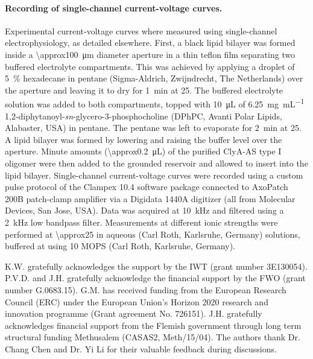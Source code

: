 \documentclass[journal=ancac3,manuscript=article,etalmode=truncate,maxauthors=0,layout=onecolumn]{achemso}
\begin{document}
\paragraph{Recording of single-channel current-voltage curves.}
%
Experimental current-voltage curves where measured using single-channel electrophysiology, as detailed
elsewhere.\cite{Maglia-2010,Soskine-2012,Soskine-2013} First, a black lipid bilayer was formed inside a
\SI{\approx100}{\um} diameter aperture in a thin teflon film separating two buffered electrolyte compartments.
This was achieved by applying a droplet of \SI{5}{\percent} hexadecane in pentane (Sigma-Aldrich, Zwijndrecht,
The Netherlands) over the aperture and leaving it to dry for \SI{1}{\minute} at \SI{25}{\dC}. The buffered
electrolyte solution was added to both compartments, topped with \SI{10}{\uL} of
\SI{6.25}{\milli\gram\per\milli\liter} 1,2-diphytanoyl-\textit{sn}-glycero-3-phosphocholine (DPhPC, Avanti
Polar Lipids, Alabaster, USA) in pentane. The pentane was left to evaporate for \SI{2}{\minute} at
\SI{25}{\dC}. A lipid bilayer was formed by lowering and raising the buffer level over the aperture. Minute
amounts (\SI{\approx0.2}{\uL}) of the purified ClyA-AS type I oligomer were then added to the grounded \cisi{}
reservoir and allowed to insert into the lipid bilayer. Single-channel current-voltage curves were recorded
using a custom pulse protocol of the Clampex 10.4 software package connected to AxoPatch 200B patch-clamp
amplifier via a Digidata 1440A digitizer (all from Molecular Devices, San Jose, USA). Data was acquired at
\SI{10}{\kHz} and filtered using a \SI{2}{\kHz} low bandpass filter. Measurements at different ionic strengths
were performed at \SI{\approx25}{\dC} in aqueous  (Carl Roth, Karlsruhe, Germany) solutions, buffered
at  using \SI{10}{\mM} MOPS (Carl Roth, Karlsruhe, Germany).

\begin{acknowledgement}
  K.W. gratefully acknowledges the support by the IWT (grant number 3E130054). P.V.D. and J.H. gratefully
  acknowledge the financial support by the FWO (grant number G.0683.15). G.M. has received funding from the
  European Research Council (ERC) under the European Union's Horizon 2020 research and innovation programme
  (Grant agreement No. 726151). J.H. gratefully acknowledges financial support from the Flemish government
  through long term structural funding Methusalem (CASAS2, Meth/15/04). The authors thank Dr. Chang Chen and
  Dr. Yi Li for their valuable feedback during discussions.
\end{acknowledgement}
\end{document}
